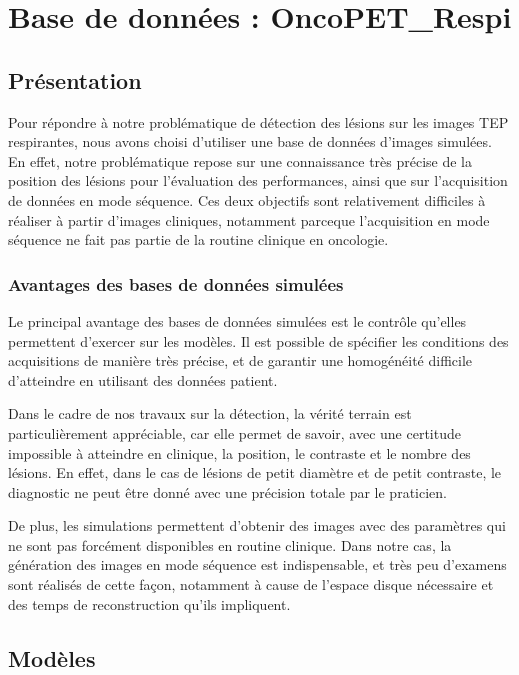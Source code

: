 \chapter{Base de données : OncoPET\_Respi}
	\label{lab:bdd}

\section{Présentation}

Pour répondre à notre problématique de détection des lésions sur les images TEP respirantes, nous avons choisi d’utiliser une base de données d’images simulées. En effet, notre problématique repose sur une connaissance très précise de la position des lésions pour l’évaluation des performances, ainsi que sur l’acquisition de données en mode séquence. Ces deux objectifs sont relativement difficiles à réaliser à partir d’images cliniques, notamment parceque l'acquisition en mode séquence ne fait pas partie de la routine clinique en oncologie.



	\subsection{Avantages des bases de données simulées}

Le principal avantage des bases de données simulées est le contrôle qu'elles permettent d'exercer sur les modèles. Il est possible de spécifier les conditions des acquisitions de manière très précise, et de garantir une homogénéité difficile d'atteindre en utilisant des données patient.

Dans le cadre de nos travaux sur la détection, la vérité terrain est particulièrement appréciable, car elle permet de savoir, avec une certitude impossible à atteindre en clinique, la position, le contraste et le nombre des lésions. En effet, dans le cas de lésions de petit diamètre et de petit contraste, le diagnostic ne peut être donné avec une précision totale par le praticien. 

De plus, les simulations permettent d’obtenir des images avec des paramètres qui ne sont pas forcément disponibles en routine clinique. Dans notre cas, la génération des images en mode séquence est indispensable, et très peu d’examens sont réalisés de cette façon, notamment à cause de l’espace disque nécessaire et des temps de reconstruction qu'ils impliquent.

	\section{Modèles}

